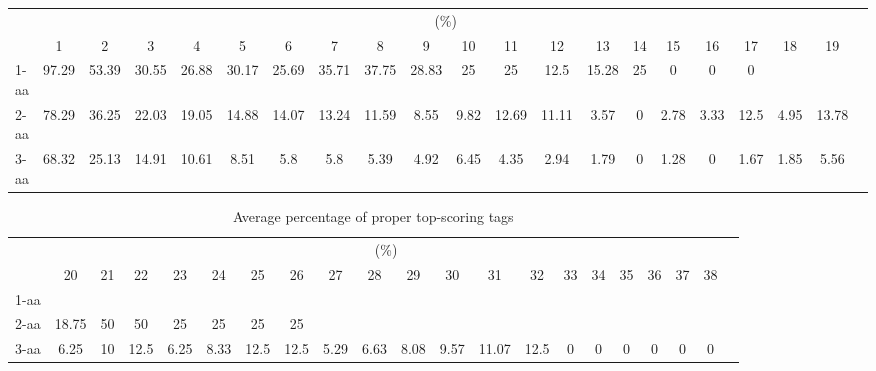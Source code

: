 \documentclass{article}
\begin{document}
\begin{table}[h]\tiny
\vspace{3mm}
{\centering
\begin{center}
\begin{tabular}{|l|c|c|c|c|c|c|c|c|c|c|c|c|c|c|c|c|c|c|c|c|}
  \hline
  & \multicolumn{ 19 }{|c|}{(\%)} \\
  \cline{2- 20}
    & 1 & 2 & 3 & 4 & 5 & 6 & 7 & 8 & 9 & 10 & 11 & 12 & 13 & 14 & 15 & 16 & 17 & 18 & 19\\
  \hline
1-aa  & 97.29 & 53.39 & 30.55 & 26.88 & 30.17 & 25.69 & 35.71 & 37.75 & 28.83 & 25 & 25 & 12.5 & 15.28 & 25 & 0 & 0 & 0 &  & \\
2-aa  & 78.29 & 36.25 & 22.03 & 19.05 & 14.88 & 14.07 & 13.24 & 11.59 & 8.55 & 9.82 & 12.69 & 11.11 & 3.57 & 0 & 2.78 & 3.33 & 12.5 & 4.95 & 13.78\\
3-aa  & 68.32 & 25.13 & 14.91 & 10.61 & 8.51 & 5.8 & 5.8 & 5.39 & 4.92 & 6.45 & 4.35 & 2.94 & 1.79 & 0 & 1.28 & 0 & 1.67 & 1.85 & 5.56\\
 \hline
\end{tabular}
\end{center}
\par}
\centering

\vspace{3mm}
\label{table:k}
\end{table}
\begin{table}[h]\tiny
\vspace{3mm}
{\centering
\begin{center}
\begin{tabular}{|l|c|c|c|c|c|c|c|c|c|c|c|c|c|c|c|c|c|c|c|c|}
  \hline
  & \multicolumn{ 19 }{|c|}{(\%)} \\
  \cline{2- 20}
    & 20 & 21 & 22 & 23 & 24 & 25 & 26 & 27 & 28 & 29 & 30 & 31 & 32 & 33 & 34 & 35 & 36 & 37 & 38\\
  \hline
1-aa  &  &  &  &  &  &  &  &  &  &  &  &  &  &  &  &  &  &  & \\
2-aa  & 18.75 & 50 & 50 & 25 & 25 & 25 & 25 &  &  &  &  &  &  &  &  &  &  &  & \\
3-aa  & 6.25 & 10 & 12.5 & 6.25 & 8.33 & 12.5 & 12.5 & 5.29 & 6.63 & 8.08 & 9.57 & 11.07 & 12.5 & 0 & 0 & 0 & 0 & 0 & 0\\
 \hline
\end{tabular}
\end{center}
\par}
\centering

\caption{ Average percentage of proper top-scoring tags}

\vspace{3mm}
\label{table:k}
\end{table}
\end{document}
